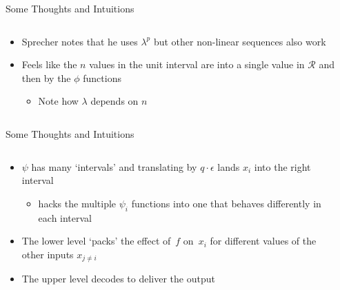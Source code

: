\begin{frame}{Some Thoughts and Intuitions}

\begin{columns}

  \begin{column}{6cm}
  \begin{itemize}
  \item Sprecher notes that he uses $\lambda^p$ but other non-linear
    sequences also work \vspace{0.5em}
  \item Feels like the $n$ values in the unit interval are
     into a single value in $\mathcal{R}$ and then
     by the $\phi$ functions \vspace{0.3em}
    \begin{itemize}
    \item Note how $\lambda$ depends on $n$
    \end{itemize}
  \end{itemize}
  \end{column}

  \begin{column}{7cm}
  
  \end{column}

\end{columns}

\end{frame}



\begin{frame}{Some Thoughts and Intuitions}

\begin{columns}

  \begin{column}{6cm}
  \begin{itemize}
  \item $\psi$ has many `intervals' and translating by $q\cdot\epsilon$
    lands $x_i$ into the right interval
    \begin{itemize}
    \item hacks the multiple $\psi_i$ functions into one that
      behaves differently in each interval
    \end{itemize}
  \item The lower level `packs' the effect of~$f$ on~$x_i$ for
    different values of the other inputs $x_{j\neq i}$
  \item The upper level decodes to deliver the output
  \end{itemize}
  \end{column}

  \begin{column}{7cm}
  
  \end{column}

\end{columns}

\end{frame}

